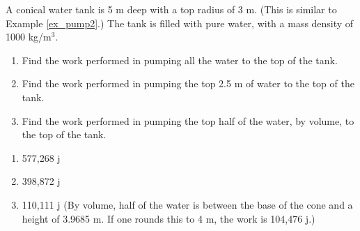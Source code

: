 {A conical water tank is 5 m deep with a top radius of 3 m. (This is similar to Example \ref{ex_pump2}.) The tank is filled with pure water, with a mass density of 1000 kg/m$^3$. 
	\begin{enumerate}
	\item		Find the work performed in pumping all the water to the top of the tank.
	\item		Find the work performed in pumping the top 2.5 m of water to the top of the tank.
	\item		Find the work performed in pumping the top half of the water, by volume, to the top of the tank.
	\end{enumerate}
}
{\begin{enumerate}
\item	577,268 j
\item	398,872 j
\item	110,111 j  (By volume, half of the water is between the base of the cone and a height of 3.9685 m. If one rounds this to 4 m, the work is 104,476 j.)
\end{enumerate}
}
